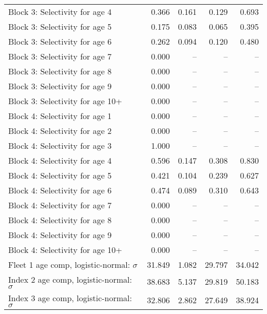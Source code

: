 \documentclass[
]{article}
\begin{document}
\begin{landscape}
\begin{longtable}[t]{lrrrr}
Block 3: Selectivity for age 4 & 0.366 & 0.161 & 0.129 & 0.693\\
Block 3: Selectivity for age 5 & 0.175 & 0.083 & 0.065 & 0.395\\
Block 3: Selectivity for age 6 & 0.262 & 0.094 & 0.120 & 0.480\\
Block 3: Selectivity for age 7 & 0.000 & -- & -- & --\\
\addlinespace
Block 3: Selectivity for age 8 & 0.000 & -- & -- & --\\
Block 3: Selectivity for age 9 & 0.000 & -- & -- & --\\
Block 3: Selectivity for age 10+ & 0.000 & -- & -- & --\\
Block 4: Selectivity for age 1 & 0.000 & -- & -- & --\\
Block 4: Selectivity for age 2 & 0.000 & -- & -- & --\\
\addlinespace
Block 4: Selectivity for age 3 & 1.000 & -- & -- & --\\
Block 4: Selectivity for age 4 & 0.596 & 0.147 & 0.308 & 0.830\\
Block 4: Selectivity for age 5 & 0.421 & 0.104 & 0.239 & 0.627\\
Block 4: Selectivity for age 6 & 0.474 & 0.089 & 0.310 & 0.643\\
Block 4: Selectivity for age 7 & 0.000 & -- & -- & --\\
\addlinespace
Block 4: Selectivity for age 8 & 0.000 & -- & -- & --\\
Block 4: Selectivity for age 9 & 0.000 & -- & -- & --\\
Block 4: Selectivity for age 10+ & 0.000 & -- & -- & --\\
Fleet 1 age comp, logistic-normal: $\sigma$ & 31.849 & 1.082 & 29.797 & 34.042\\
Index 2 age comp, logistic-normal: $\sigma$ & 38.683 & 5.137 & 29.819 & 50.183\\
\addlinespace
Index 3 age comp, logistic-normal: $\sigma$ & 32.806 & 2.862 & 27.649 & 38.924\\*
\end{longtable}
\end{landscape}
\end{document}
